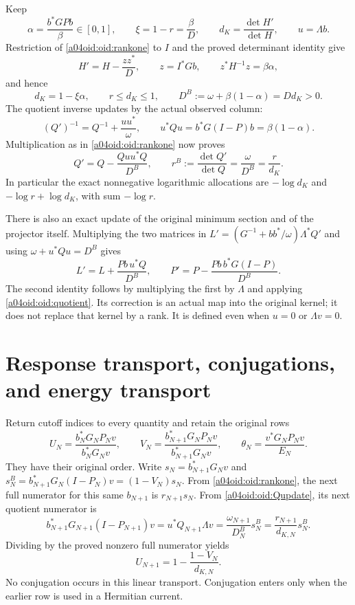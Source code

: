 Keep
\[
 \alpha=\frac{b^*GPb}{\beta}\in[0,1],\qquad
 \xi=1-r=\frac\beta D,\qquad
 d_K=\frac{\det H'}{\det H},\qquad u=\Lambda b.
\]
Restriction of \eqref{a04oid:oid:rankone} to $I$ and the proved determinant
identity give
\[
 H'=H-\frac{zz^*}{D},\qquad z=I^*Gb,\qquad
 z^*H^{-1}z=\beta\alpha,
\]
and hence
\begin{equation}\label{a04oid:oid:allocations}
 d_K=1-\xi\alpha,\qquad r\le d_K\le1,\qquad
 D^B:=\omega+\beta(1-\alpha)=Dd_K>0.
\end{equation}
The quotient inverse updates by the actual observed column:
\[
 (Q')^{-1}=Q^{-1}+\frac{uu^*}{\omega},\qquad
 u^*Qu=b^*G(I-P)b=\beta(1-\alpha).
\]
Multiplication as in \eqref{a04oid:oid:rankone} now proves
\begin{equation}\label{a04oid:oid:Qupdate}
 Q'=Q-\frac{Quu^*Q}{D^B},\qquad
 r^B:=\frac{\det Q'}{\det Q}
 =\frac\omega{D^B}=\frac r{d_K}.
\end{equation}
In particular the exact nonnegative logarithmic allocations are
$-\log d_K$ and $-\log r+\log d_K$, with sum $-\log r$.

There is also an exact update of the original minimum section and
of the projector itself. Multiplying the two matrices in
$L'=(G^{-1}+bb^*/\omega)\Lambda^*Q'$ and using
$\omega+u^*Qu=D^B$ gives
\begin{equation}\label{a04oid:oid:projector}
 L'=L+\frac{Pb\,u^*Q}{D^B},\qquad
 P'=P-\frac{Pb\,b^*G(I-P)}{D^B}.
\end{equation}
The second identity follows by multiplying the first by $\Lambda$
and applying \eqref{a04oid:oid:quotient}. Its correction is an actual map
into the original kernel; it does not replace that kernel by a rank.
It is defined even when $u=0$ or $\Lambda v=0$.

\section{Response transport, conjugations, and energy transport}

Return cutoff indices to every quantity and retain the original rows
\begin{equation}\label{a04oid:oid:UV}
 U_N=\frac{b_N^*G_NP_Nv}{b_N^*G_Nv},\qquad
 V_N=\frac{b_{N+1}^*G_NP_Nv}{b_{N+1}^*G_Nv},\qquad
 \theta_N=\frac{v^*G_NP_Nv}{E_N}.
\end{equation}
They have their original order. Write
$s_N=b_{N+1}^*G_Nv$ and
$s_N^B=b_{N+1}^*G_N(I-P_N)v=(1-V_N)s_N$.
From \eqref{a04oid:oid:rankone}, the next full numerator for this same
$b_{N+1}$ is $r_{N+1}s_N$. From \eqref{a04oid:oid:Qupdate}, its next
quotient numerator is
\begin{equation}\label{a04oid:oid:transportnumerator}
 b_{N+1}^*G_{N+1}(I-P_{N+1})v
 =u^*Q_{N+1}\Lambda v
 =\frac{\omega_{N+1}}{D_N^B}s_N^B
 =\frac{r_{N+1}}{d_{K,N}}s_N^B.
\end{equation}
Dividing by the proved nonzero full numerator yields
\begin{equation}\label{a04oid:oid:response}
 \boxed{U_{N+1}=1-\frac{1-V_N}{d_{K,N}}.}
\end{equation}
No conjugation occurs in this linear transport. Conjugation enters
only when the earlier row is used in a Hermitian current.

